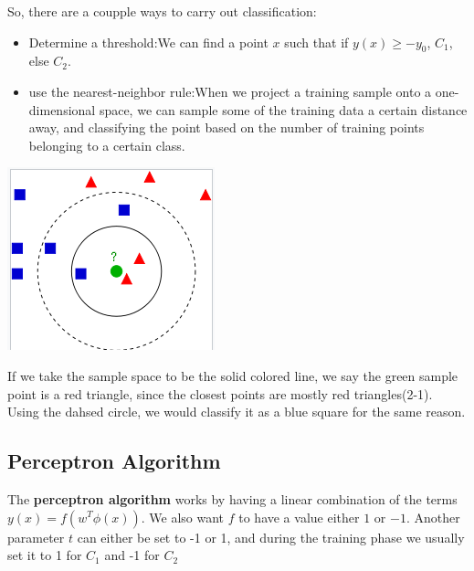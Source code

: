 \documentclass{tufte-handout}
\begin{document}
	So, there are a coupple ways to carry out classification:
	\begin{itemize}
			\item{Determine a threshold}:We can find a point $x$ such that if $y(x)\geq -y_{0}$,
					$C_{1}$, else $C_{2}$.
			\item{use the nearest-neighbor rule}:When we project a training sample onto a 
					one-dimensional space, we can sample some of the training data a certain 
					distance away, and classifying the point based on the number of training 
					points belonging to a certain class.
	\end{itemize}
	\begin{marginfigure}
			\includegraphics[width=\linewidth]{nearest_neighbors}
			\caption{If we take the sample space to be the solid colored line, we say the green
				sample point is a red triangle, since the closest points are mostly red triangles(2-1).
				Using the dahsed circle, we would classify it as a blue square for the same reason.}
	\end{marginfigure}
\subsection{Perceptron Algorithm}
	The \textbf{perceptron algorithm} works by having a linear combination of the terms 
	$y(x) = f(w^{T}\phi(x))$. We also want $f$ to have a value either $1$ or $-1$. Another
	parameter $t$ can either be set to -1 or 1, and during the training phase we usually set it
	to 1 for $C_{1}$ and -1 for $C_{2}$
	
\end{document}
